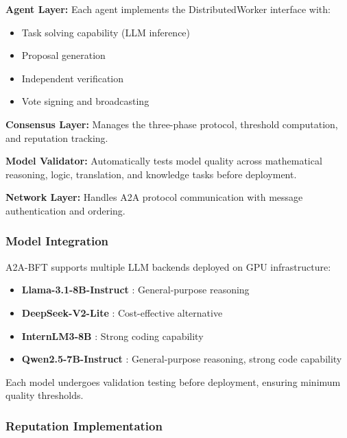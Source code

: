\documentclass{article}
\begin{document}
\textbf{Agent Layer:} Each agent implements the DistributedWorker interface with:
\begin{itemize}
    \item Task solving capability (LLM inference)
    \item Proposal generation
    \item Independent verification
    \item Vote signing and broadcasting
\end{itemize}

\textbf{Consensus Layer:} Manages the three-phase protocol, threshold computation, and reputation tracking.

\textbf{Model Validator:} Automatically tests model quality across mathematical reasoning, logic, translation, and knowledge tasks before deployment.

\textbf{Network Layer:} Handles A2A protocol communication with message authentication and ordering.

\subsubsection{Model Integration}

A2A-BFT supports multiple LLM backends deployed on GPU infrastructure:
\begin{itemize}
    \item \textbf{Llama-3.1-8B-Instruct} \citep{meta2024llama}: General-purpose reasoning
    \item \textbf{DeepSeek-V2-Lite} \citep{deepseek2024}: Cost-effective alternative
    \item \textbf{InternLM3-8B} \citep{internlm2024}: Strong coding capability
    \item \textbf{Qwen2.5-7B-Instruct} \citep{qwen2024qwen}: General-purpose reasoning, strong code capability
\end{itemize}

Each model undergoes validation testing before deployment, ensuring minimum quality thresholds.

\subsubsection{Reputation Implementation}
\end{document}
